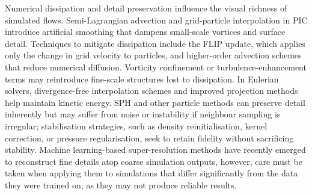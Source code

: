 Numerical dissipation and detail preservation influence the visual richness of simulated flows. Semi-Lagrangian advection and grid-particle interpolation in PIC introduce artificial smoothing that dampens small-scale vortices and surface detail. Techniques to mitigate dissipation include the FLIP update, which applies only the change in grid velocity to particles, and higher-order advection schemes that reduce numerical diffusion. Vorticity confinement or turbulence-enhancement terms may reintroduce fine-scale structures lost to dissipation. In Eulerian solvers, divergence-free interpolation schemes and improved projection methods help maintain kinetic energy. SPH and other particle methods can preserve detail inherently but may suffer from noise or instability if neighbour sampling is irregular; stabilisation strategies, such as density reinitialisation, kernel correction, or pressure regularisation, seek to retain fidelity without sacrificing stability. Machine learning-based super-resolution methods have recently emerged to reconstruct fine details atop coarse simulation outputs, however, care must be taken when applying them to simulations that differ significantly from the data they were trained on, as they may not produce reliable results.






